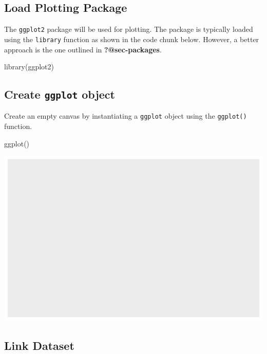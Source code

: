 \documentclass[
  letterpaper,
  DIV=11,
  numbers=noendperiod]{scrreprt}
\newenvironment{Shaded}{\begin{snugshade}}{\end{snugshade}}
\newcommand{\FunctionTok}[1]{\textcolor[rgb]{0.28,0.35,0.67}{#1}}
\newcommand{\NormalTok}[1]{\textcolor[rgb]{0.00,0.23,0.31}{#1}}
\begin{document}
\subsection{Load Plotting Package}\label{load-plotting-package}

The \texttt{ggplot2} package will be used for plotting. The package is
typically loaded using the \texttt{library} function as shown in the
code chunk below. However, a better approach is the one outlined in
\textbf{?@sec-packages}.

\begin{Shaded}
\begin{Highlighting}[]
\FunctionTok{library}\NormalTok{(ggplot2)}
\end{Highlighting}
\end{Shaded}

\subsection{\texorpdfstring{Create \texttt{ggplot}
object}{Create ggplot object}}\label{create-ggplot-object}

Create an empty canvas by instantiating a \texttt{ggplot} object using
the \texttt{ggplot()} function.

\begin{Shaded}
\begin{Highlighting}[]
\FunctionTok{ggplot}\NormalTok{()}
\end{Highlighting}
\end{Shaded}

\includegraphics{src/r-for-data-science/01-data-viz_files/figure-pdf/unnamed-chunk-7-1.pdf}

\subsection{Link Dataset}\label{link-dataset}
\end{document}
